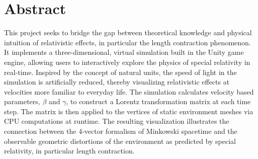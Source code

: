 \documentclass[a4paper]{article}
\author{%
  \begin{flushleft}
  \textbf{Axel Hammarskiöld Spendrup}\\
  Email: \textit{\href{mailto:axelhs@kth.se}{axelhs@kth.se}}\\[1ex]
  Source code: \textit{\href{https://github.com/4xwell/beta-boost}{Github repository}}\\
  Project blog: \textit{\href{https://lorentztransform.wordpress.com}{lorentztransform.wordpress.com}}\\[1ex]
  {Grade aim: \textbf{A}}
  \end{flushleft}
}
\date{%
  \begin{flushleft}
  Stockholm, Sweden\\
  \today
  \vspace*{-5em}
  \end{flushleft}
}
\begin{document}
\maketitle
\thispagestyle{titlepage}



\section*{Abstract}
This project seeks to bridge the gap between theoretical knowledge and physical intuition of relativistic effects, in particular the length contraction phenomenon. It implements a three-dimensional, virtual simulation built in the Unity game engine, allowing users to interactively explore the physics of special relativity in real-time. Inspired by the concept of natural units, the speed of light in the simulation is artificially reduced, thereby visualizing relativistic effects at velocities more familiar to everyday life. The simulation calculates velocity based parameters, $\beta$ and $\gamma$, to construct a Lorentz transformation matrix at each time step. The matrix is then applied to the vertices of static environment meshes via CPU computations at runtime. The resulting visualization illustrates the connection between the 4-vector formalism of Minkowski spacetime and the observable geometric distortions of the environment as predicted by special relativity, in particular length contraction.
\end{document}
